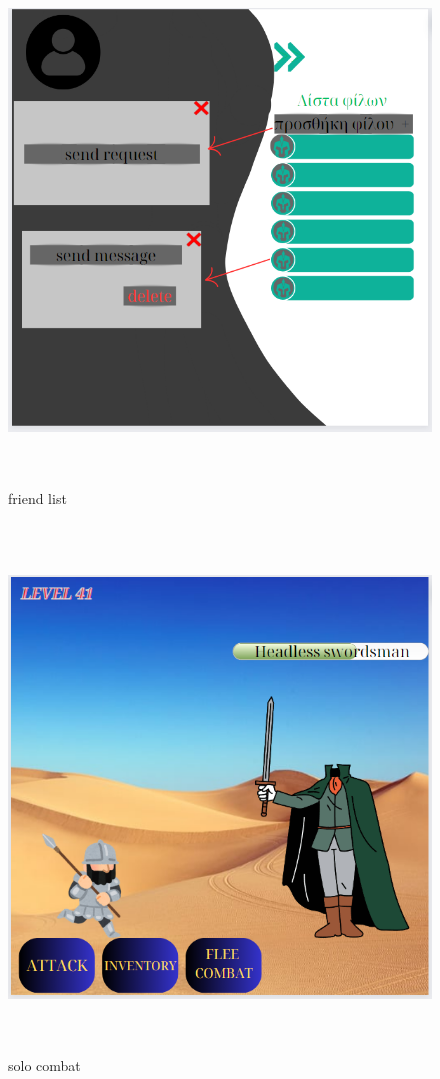 \begin{figure}[!htb]
  \centering
    \centering
    \includegraphics[width=\textwidth,height=14cm]{mockup4.jpg}
    \caption{friend list}
    \label{}
\end{figure}
\begin{figure}[!htb]
  \centering
    \centering
    \includegraphics[width=\textwidth,height=14cm]{mockup5.jpg}
    \caption{solo combat}
    \label{}
\end{figure}
